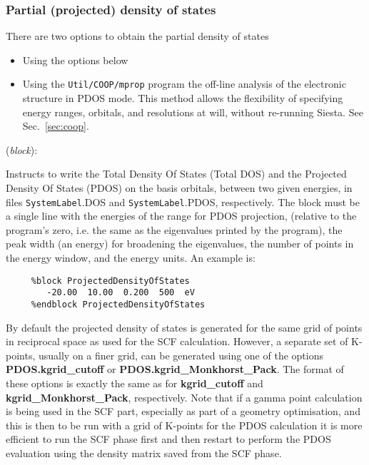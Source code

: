\documentclass[11pt]{article}
\begin{document}
\subsubsection{Partial (projected) density of states}

There are two options to obtain the partial density of states
\begin{itemize}
\item Using the options below
\item Using the {\tt Util/COOP/mprop} program the off-line analysis of
  the electronic structure in PDOS mode. This method allows the
  flexibility of specifying energy ranges, orbitals, and resolutions
  at will, without re-running {\sc Siesta}. See Sec.~\ref{sec:coop}.
\end{itemize}

\begin{description}
\itemsep 10pt
\parsep 0pt
\item[{\bf ProjectedDensityOfStates}] ({\it block}):

Instructs to write the Total Density Of States (Total DOS) and the 
Projected Density Of States (PDOS) on the basis orbitals,
between two given energies,
in files {\tt SystemLabel}.DOS and 
{\tt SystemLabel}.PDOS, respectively. 
The block must be a single line with the energies of the range for 
PDOS projection,
(relative to the program's zero, i.e. the same as the eigenvalues
printed by the program), the peak width (an energy) for broadening
the eigenvalues, the number of points in the energy window, 
and the energy units.
An example is:

\begin{verbatim}
     %block ProjectedDensityOfStates
        -20.00  10.00  0.200  500  eV
     %endblock ProjectedDensityOfStates
\end{verbatim}

By default the projected density of states is generated for the same
grid of points in reciprocal space as used for the SCF calculation.
However, a separate set of K-points, usually on a finer grid, can 
be generated using one of the options \textbf{PDOS.kgrid\_cutoff} or
\textbf{PDOS.kgrid\_Monkhorst\_Pack}. The format of these options is
exactly the same as for \textbf{kgrid\_cutoff} and 
\textbf{kgrid\_Monkhorst\_Pack}, respectively. Note that if a gamma
point calculation is being used in the SCF part, especially as part
of a geometry optimisation, and this is then to
be run with a grid of K-points for the PDOS calculation it is more
efficient to run the SCF phase first and then restart to perform the
PDOS evaluation using the density matrix saved from the SCF phase. 


\end{description}
\end{document}
